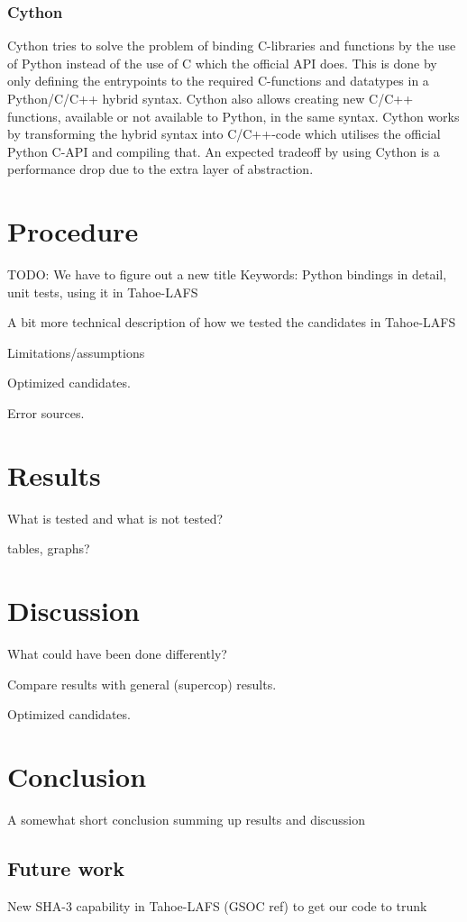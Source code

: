 \documentclass[english,12pt,a4paper]{book}
\begin{document}
\subsection{Cython}
Cython tries to solve the problem of binding C-libraries and functions by the
use of Python instead of the use of C which the official API does. This is done
by only defining the entrypoints to the required C-functions and datatypes in a
Python/C/C++ hybrid syntax. Cython also allows creating new C/C++ functions,
available or not available to Python, in the same syntax. Cython works by
transforming the hybrid syntax into C/C++-code which utilises the official
Python C-API and compiling that. An expected tradeoff by using Cython is a
performance drop due to the extra layer of abstraction.


\chapter{Procedure}

TODO: We have to figure out a new title
Keywords: Python bindings in detail, unit tests, using it in Tahoe-LAFS

A bit more technical description of how we tested the candidates in Tahoe-LAFS

Limitations/assumptions

Optimized candidates.

Error sources.


\chapter{Results}

What is tested and what is not tested?

tables, graphs?


\chapter{Discussion}

What could have been done differently?

Compare results with general (supercop) results.

Optimized candidates.

\cite{s_nistround2}


\chapter{Conclusion}

A somewhat short conclusion summing up results and discussion

\section{Future work}

New SHA-3 capability in Tahoe-LAFS (GSOC ref) to get our code to trunk





\appendix
\appendixpage
\addappheadtotoc

\end{document}
